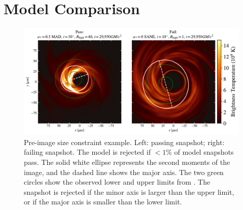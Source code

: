 \section{Model Comparison}\label{sec:comparisons}

\begin{figure}
  \centering\hspace{18pt}
  \includegraphics[width=6.5in]{figures/passfail_sz.pdf}
  \caption{Pre-image size constraint example.
    Left: passing snapshot;
    right: failing snapshot.
    The model is rejected if $< 1\%$ of model snapshots pass.
    The solid white ellipse  represents the second moments of the image, and the dashed line shows the major axis.
    The two green circles show the observed lower and upper limits from .
    The snapshot is rejected if the minor axis is larger than the upper limit, or if the major axis is smaller than the lower limit.}
  \label{fig:passfail_sz}
\end{figure}

